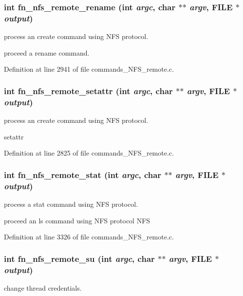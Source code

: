 \subsubsection[{fn\_\-nfs\_\-remote\_\-rename}]{\setlength{\rightskip}{0pt plus 5cm}int fn\_\-nfs\_\-remote\_\-rename (int {\em argc}, \/  char $\ast$$\ast$ {\em argv}, \/  FILE $\ast$ {\em output})}\label{commands_8h_a385e00e4402183dcf9d7bbc6d17de3da}
process an create command using NFS protocol.

proceed a rename command. 

Definition at line 2941 of file commands\_\-NFS\_\-remote.c.
\subsubsection[{fn\_\-nfs\_\-remote\_\-setattr}]{\setlength{\rightskip}{0pt plus 5cm}int fn\_\-nfs\_\-remote\_\-setattr (int {\em argc}, \/  char $\ast$$\ast$ {\em argv}, \/  FILE $\ast$ {\em output})}\label{commands_8h_a6cd8456d9ed8ef731cb45ccb4168847a}
process an create command using NFS protocol.

setattr 

Definition at line 2825 of file commands\_\-NFS\_\-remote.c.
\subsubsection[{fn\_\-nfs\_\-remote\_\-stat}]{\setlength{\rightskip}{0pt plus 5cm}int fn\_\-nfs\_\-remote\_\-stat (int {\em argc}, \/  char $\ast$$\ast$ {\em argv}, \/  FILE $\ast$ {\em output})}\label{commands_8h_aa1c93ad1ec1bd3c6b83787fbf3983a1f}
process a stat command using NFS protocol.

proceed an ls command using NFS protocol NFS 

Definition at line 3326 of file commands\_\-NFS\_\-remote.c.
\subsubsection[{fn\_\-nfs\_\-remote\_\-su}]{\setlength{\rightskip}{0pt plus 5cm}int fn\_\-nfs\_\-remote\_\-su (int {\em argc}, \/  char $\ast$$\ast$ {\em argv}, \/  FILE $\ast$ {\em output})}\label{commands_8h_a7e50bf8f40b54033ee4afb6055b2aac2}
change thread credentials. 


